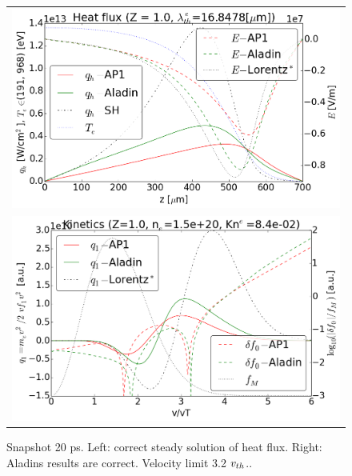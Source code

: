 \begin{figure}[tbh]
  \begin{center}
    \begin{tabular}{c}
      \includegraphics[width=\figscale\textwidth]{../VFPdata/C7_Aladin_case6_heatflux.png} \\
      \includegraphics[width=\figscale\textwidth]{../VFPdata/C7_Aladin_case6_kinetics.png}
    \end{tabular}
  \caption{  
  Snapshot 20 ps. Left: correct steady solution of heat flux. 
  Right: Aladins results are correct. Velocity limit 3.2 $v_{th}$..
  }
  \end{center}
  \label{fig:C7_Aladin_case6}
\end{figure}

